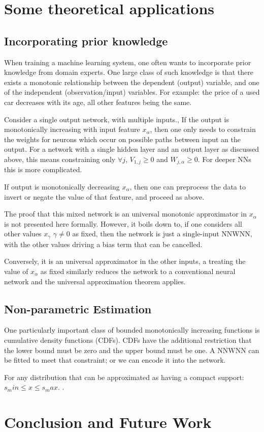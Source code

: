 \documentclass{article} %
\begin{document}
\section{Some theoretical applications}

\subsection{Incorporating prior knowledge}
When training a machine learning system,
one often wants to incorporate prior knowledge from domain experts.
One large class of such knowledge is that there exists a monotonic relationship between the dependent (output) variable, and one of the independent (observation/input) variables.
For example: the price of a used car decreases with its age, all other features being the same.

Consider a single output network, with multiple inputs.,
If the output is monotonically increasing with input feature $x_\alpha$,
then one only needs to constrain the weights for neurons which occur on possible paths between input an the output.
For a network with a single hidden layer  and an output layer as discussed above,
this means constraining only $\forall j$, $V_{1,j} \ge 0$ and $W_{j, \alpha} \ge 0$.
For deeper NNs this is more complicated. 

If output  is monotonically decreasing $x_\alpha$, then one can preprocess the data to invert or negate the value of that feature, and proceed as above.

The proof that this mixed network is an universal monotonic approximator in  $x_\alpha$ is not presented here formally.
However, it boils down to, if one considers all other values $x_\gamma$ $\gamma \ne 0$ as fixed, then the network is just a single-input NNWNN, with the other values driving a bias term that can be cancelled.

Conversely, it is an universal approximator in the other inputs,
a treating the value of $x_\alpha$ as fixed similarly reduces the network to a conventional neural network and the universal approximation theorem applies.






\subsection{Non-parametric Estimation}
One particularly important class of bounded monotonically increasing functions is
cumulative density functions (CDFs).
CDFs have the additional restriction that the lower bound must be zero and the upper bound must be one.
A NNWNN can be fitted to meet that constraint;
or we can encode it into the network.

For any distribution that can be approximated as having a compact support:
$s_min \le x \le s_max$.
.





	
\section{Conclusion and Future Work}



\end{document}
